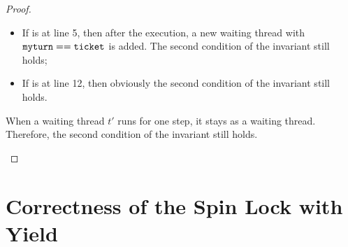 \documentclass{article}[10pt]
\begin{document}
\begin{proof}
\begin{itemize}
\begin{itemize}
    \item If  is at line 5, then after the execution, a new
      waiting thread with $\text{\ttfamily myturn} == \text{\ttfamily ticket}$ is added. The second
      condition of the invariant still holds;

    \item If  is at line 12, then obviously the second
      condition of the invariant still holds.

    \end{itemize}
    When a waiting thread $t'$ runs for one step, it stays as a
    waiting thread. Therefore, the second condition of the invariant
    still holds.
    
  \end{itemize}


\end{proof}


\section{Correctness of the Spin Lock with Yield}
\label{sec:spin-lock-yield}
\end{document}
